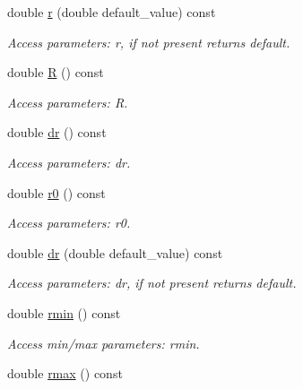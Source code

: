 \begin{DoxyCompactItemize}
double \hyperlink{struct_d_d4hep_1_1_x_m_l_1_1_child_value_a205312befd2bb91090093b7fc16cdd44}{r} (double default\_\-value) const 
\begin{DoxyCompactList}\small\item\em Access parameters: r, if not present returns default. \item\end{DoxyCompactList}\item 
double \hyperlink{struct_d_d4hep_1_1_x_m_l_1_1_child_value_a129d3a6eb37511d23b64ea58a3dedd2a}{R} () const 
\begin{DoxyCompactList}\small\item\em Access parameters: R. \item\end{DoxyCompactList}\item 
double \hyperlink{struct_d_d4hep_1_1_x_m_l_1_1_child_value_ac963bcbd1827f29bf2fb5c975fced5f3}{dr} () const 
\begin{DoxyCompactList}\small\item\em Access parameters: dr. \item\end{DoxyCompactList}\item 
double \hyperlink{struct_d_d4hep_1_1_x_m_l_1_1_child_value_a0f810f64e3c5e67f3fbef0549ac550b7}{r0} () const 
\begin{DoxyCompactList}\small\item\em Access parameters: r0. \item\end{DoxyCompactList}\item 
double \hyperlink{struct_d_d4hep_1_1_x_m_l_1_1_child_value_aee247a351467464656a068ad5872920d}{dr} (double default\_\-value) const 
\begin{DoxyCompactList}\small\item\em Access parameters: dr, if not present returns default. \item\end{DoxyCompactList}\item 
double \hyperlink{struct_d_d4hep_1_1_x_m_l_1_1_child_value_a5838118c21da60268fcb9c8ade70e532}{rmin} () const 
\begin{DoxyCompactList}\small\item\em Access min/max parameters: rmin. \item\end{DoxyCompactList}\item 
double \hyperlink{struct_d_d4hep_1_1_x_m_l_1_1_child_value_a94ef57d56ce57a66bf482c77d5d7e2dc}{rmax} () const 

\end{DoxyCompactItemize}
